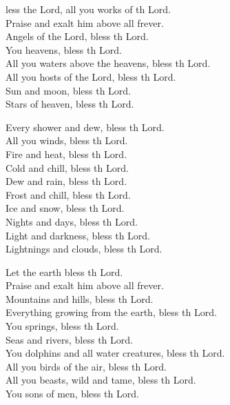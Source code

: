 \settowidth{\versewidth}{Let us bless the Father, and the Son, and the Holy Spirit. *}
\begin{psalmverse}%
  \begin{patverse}
    less the Lord, all you works of th Lord.\Med\\
Praise and exalt him above all frever.\\
Angels of the Lord, bless th Lord.\Med\\
You heavens, bless th Lord.\\
All you waters above the heavens, bless th Lord.\Med\\
All you hosts of the Lord, bless th Lord.\\
Sun and moon, bless th Lord.\Med\\
Stars of heaven, bless th Lord.

Every shower and dew, bless th Lord.\Med\\
All you winds, bless th Lord.\\
Fire and heat, bless th Lord.\Med\\
Cold and chill, bless th Lord.\\
Dew and rain, bless th Lord.\Med\\
Frost and chill, bless th Lord.\\
Ice and snow, bless th Lord.\Med\\
Nights and days, bless th Lord.\\
Light and darkness, bless th Lord.\Med\\
Lightnings and clouds, bless th Lord.

Let the earth bless th Lord.\Med\\
Praise and exalt him above all frever.\\
Mountains and hills, bless th Lord.\Med\\
Everything growing from the earth, bless th Lord.\\
You springs, bless th Lord.\Med\\
Seas and rivers, bless th Lord.\\
You dolphins and all water creatures, bless th Lord.\Med\\
All you birds of the air, bless th Lord.\\
All you beasts, wild and tame, bless th Lord.\Med\\
You sons of men, bless th Lord.


\end{patverse}
\end{psalmverse}
